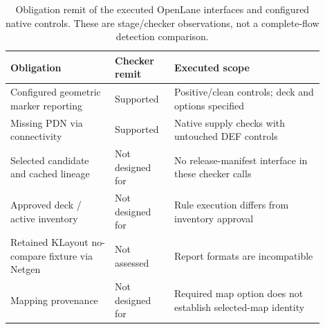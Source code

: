 \begin{table}[htbp]\centering\small\setlength{\tabcolsep}{4pt}
\caption{Obligation remit of the executed OpenLane interfaces and configured native controls. These are stage/checker observations, not a complete-flow detection comparison.}\label{tab:checkerobligations}
\begin{tabular}{@{}>{\raggedright\arraybackslash}p{0.30\linewidth}>{\raggedright\arraybackslash}p{0.17\linewidth}>{\raggedright\arraybackslash}p{0.43\linewidth}@{}}\toprule
Obligation & Checker remit & Executed scope \\
\midrule
Configured geometric marker reporting & Supported & Positive/clean controls; deck and options specified \\
Missing PDN via connectivity & Supported & Native supply checks with untouched DEF controls \\
Selected candidate and cached lineage & Not designed for & No release-manifest interface in these checker calls \\
Approved deck / active inventory & Not designed for & Rule execution differs from inventory approval \\
Retained KLayout no-compare fixture via Netgen & Not assessed & Report formats are incompatible \\
Mapping provenance & Not designed for & Required map option does not establish selected-map identity \\
\bottomrule\end{tabular}\end{table}
